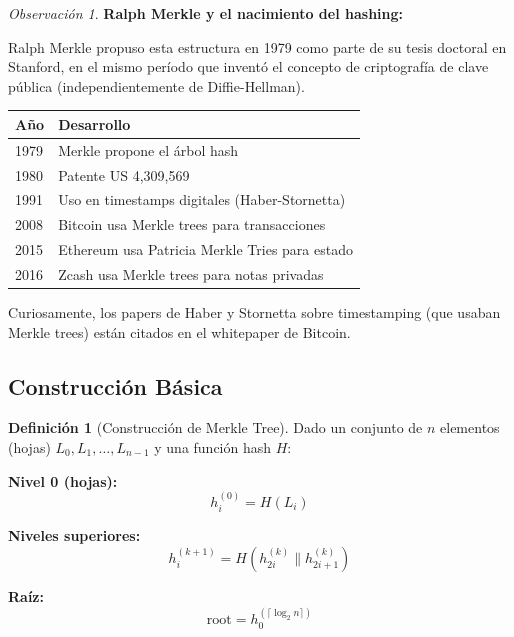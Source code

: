\documentclass[11pt,a4paper,twoside,openright]{book}
\theoremstyle{definition}
\newtheorem{definition}{Definición}[chapter]
\theoremstyle{plain}
\theoremstyle{remark}
\newtheorem{remark}{Observación}[chapter]
\begin{document}
\begin{remark}
\textbf{Ralph Merkle y el nacimiento del hashing:}

Ralph Merkle propuso esta estructura en 1979 como parte de su tesis doctoral en Stanford, en el mismo período que inventó el concepto de criptografía de clave pública (independientemente de Diffie-Hellman).

\begin{center}
\begin{tabular}{ll}
\toprule
\textbf{Año} & \textbf{Desarrollo} \\
\midrule
1979 & Merkle propone el árbol hash \\
1980 & Patente US 4,309,569 \\
1991 & Uso en timestamps digitales (Haber-Stornetta) \\
2008 & Bitcoin usa Merkle trees para transacciones \\
2015 & Ethereum usa Patricia Merkle Tries para estado \\
2016 & Zcash usa Merkle trees para notas privadas \\
\bottomrule
\end{tabular}
\end{center}

Curiosamente, los papers de Haber y Stornetta sobre timestamping (que usaban Merkle trees) están citados en el whitepaper de Bitcoin.
\end{remark}

\subsection{Construcción Básica}

\begin{definition}[Construcción de Merkle Tree]
Dado un conjunto de $n$ elementos (hojas) $L_0, L_1, \ldots, L_{n-1}$ y una función hash $H$:

\textbf{Nivel 0 (hojas):}
\[ h_i^{(0)} = H(L_i) \]

\textbf{Niveles superiores:}
\[ h_i^{(k+1)} = H(h_{2i}^{(k)} \| h_{2i+1}^{(k)}) \]

\textbf{Raíz:}
\[ \text{root} = h_0^{(\lceil \log_2 n \rceil)} \]
\end{definition}
\end{document}
